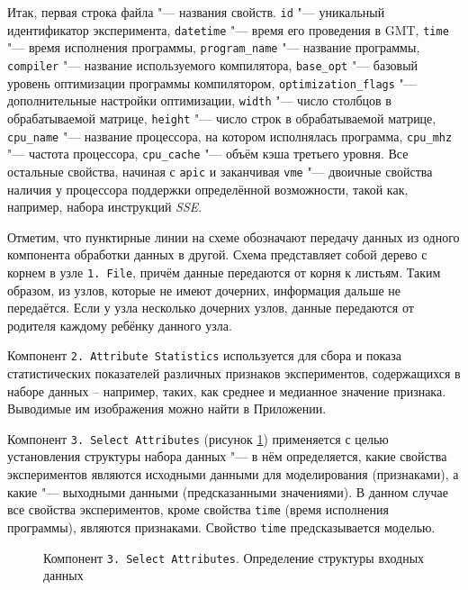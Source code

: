 Итак, первая строка файла "--- названия свойств. \texttt{id} "--- уникальный идентификатор эксперимента, \texttt{datetime} "--- время его проведения в GMT, \texttt{time} "--- время исполнения программы,  \texttt{program\_name} "--- название программы, \texttt{compiler} "--- название используемого компилятора, \texttt{base\_opt} "--- базовый уровень оптимизации программы компилятором, \texttt{optimization\_flags}  "--- дополнительные настройки оптимизации, \texttt{width} "--- число столбцов в обрабатываемой матрице, \texttt{height} "--- число строк в обрабатываемой матрице, \texttt{cpu\_name} "--- название процессора, на котором исполнялась программа, \texttt{cpu\_mhz} "--- частота процессора, \texttt{cpu\_cache} "--- объём кэша третьего уровня. Все остальные свойства, начиная с \texttt{apic} и заканчивая \texttt{vme} "--- двоичные свойства наличия у процессора поддержки определённой возможности, такой как, например, набора инструкций \textit{SSE}.

Отметим, что пунктирные линии на схеме обозначают передачу данных из одного компонента обработки данных в другой. Схема представляет собой дерево с корнем в узле \texttt{1.\,File}, причём данные передаются от корня к листьям. Таким образом, из узлов, которые не имеют дочерних, информация дальше не передаётся. Если у узла несколько дочерних узлов, данные передаются от родителя каждому ребёнку данного узла.

Компонент \texttt{2.\,Attribute~Statistics} используется для сбора и показа статистических показателей различных признаков экспериментов, содержащихся в наборе данных -- например, таких, как среднее и медианное значение признака. Выводимые им изображения можно найти в Приложении.

Компонент \texttt{3.\,Select~Attributes} (рисунок \ref{img:3-Select-Attributes}) применяется с целью установления структуры набора данных "--- в нём определяется, какие свойства экспериментов являются исходными данными для моделирования (признаками), а какие "--- выходными данными (предсказанными значениями). В данном случае все свойства экспериментов, кроме свойства \texttt{time} (время исполнения программы), являются признаками. Свойство \texttt{time} предсказывается моделью.

\begin{figure}[tbp]
    \caption{Компонент \texttt{3.\,Select~Attributes}. Определение структуры входных данных}
    \label{img:3-Select-Attributes}
\end{figure}

